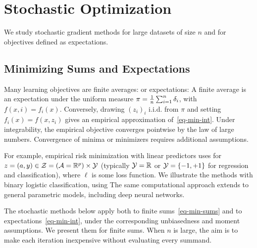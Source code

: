 
\section{Stochastic Optimization}
\label{sec-stochastic-optim}

We study stochastic gradient methods for large datasets of size $n$ and for objectives defined as expectations.


\subsection{Minimizing Sums and Expectations}

Many learning objectives are finite averages:
or expectations:
A finite average is an expectation under the uniform measure $\pi=\frac1n\sum_{i=1}^n\delta_i$, with $f(x,i)=f_i(x)$. Conversely, drawing $(z_i)_i$ i.i.d. from $\pi$ and setting $f_i(x)=f(x,z_i)$ gives an empirical approximation of~\eqref{eq-min-int}. Under integrability, the empirical objective converges pointwise by the law of large numbers. Convergence of minima or minimizers requires additional assumptions.

For example, empirical risk minimization with linear predictors uses
for $z=(a,y) \in \mathcal{Z} = (\mathcal{A}=\mathbb{R}^p) \times \mathcal{Y}$ (typically $\mathcal{Y}=\mathbb{R}$ or $\mathcal{Y}=\{-1,+1\}$ for regression and classification), where $\ell$ is some loss function. 
%
We illustrate the methods with binary logistic classification, using
The same computational approach extends to general parametric models, including deep neural networks.

The stochastic methods below apply both to finite sums~\eqref{eq-min-sums} and to expectations~\eqref{eq-min-int}, under the corresponding unbiasedness and moment assumptions. We present them for finite sums. When $n$ is large, the aim is to make each iteration inexpensive without evaluating every summand.


